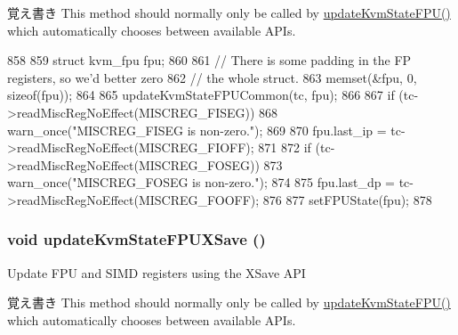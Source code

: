 \begin{DoxyNote}{覚え書き}
This method should normally only be called by \hyperlink{classX86KvmCPU_a1c8ff9ec0ad33f11a2212a37e2a79f6c}{updateKvmStateFPU()} which automatically chooses between available APIs. 
\end{DoxyNote}



\begin{DoxyCode}
858 {
859     struct kvm_fpu fpu;
860 
861     // There is some padding in the FP registers, so we'd better zero
862     // the whole struct.
863     memset(&fpu, 0, sizeof(fpu));
864 
865     updateKvmStateFPUCommon(tc, fpu);
866 
867     if (tc->readMiscRegNoEffect(MISCREG_FISEG))
868         warn_once("MISCREG_FISEG is non-zero.\n");
869 
870     fpu.last_ip = tc->readMiscRegNoEffect(MISCREG_FIOFF);
871 
872     if (tc->readMiscRegNoEffect(MISCREG_FOSEG))
873         warn_once("MISCREG_FOSEG is non-zero.\n");
874 
875     fpu.last_dp = tc->readMiscRegNoEffect(MISCREG_FOOFF);
876 
877     setFPUState(fpu);
878 }
\end{DoxyCode}
\hypertarget{classX86KvmCPU_aa1d3c8572c67dd0c4457ba46307f35f1}{
\subsubsection[{updateKvmStateFPUXSave}]{\setlength{\rightskip}{0pt plus 5cm}void updateKvmStateFPUXSave ()}}
\label{classX86KvmCPU_aa1d3c8572c67dd0c4457ba46307f35f1}
Update FPU and SIMD registers using the XSave API

\begin{DoxyNote}{覚え書き}
This method should normally only be called by \hyperlink{classX86KvmCPU_a1c8ff9ec0ad33f11a2212a37e2a79f6c}{updateKvmStateFPU()} which automatically chooses between available APIs. 
\end{DoxyNote}



